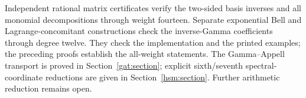Independent rational matrix certificates verify the two-sided basis
inverses and all monomial decompositions through weight fourteen.
Separate exponential Bell and Lagrange-concomitant constructions check
the inverse-Gamma coefficients through degree twelve.  They check the
implementation and the printed examples; the preceding proofs establish
the all-weight statements.  The Gamma--Appell transport is proved in Section~\ref{gat:section};
explicit sixth/seventh spectral-coordinate reductions are given in
Section~\ref{hsm:section}. Further arithmetic reduction remains open.

